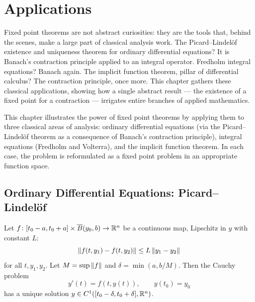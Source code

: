 \chapter{Applications}
\label{ch:applications}

Fixed point theorems are not abstract curiosities: they are the tools that, behind the scenes, make a large part of classical analysis work. The Picard--Lindel\"of existence and uniqueness theorem for ordinary differential equations? It is Banach's contraction principle applied to an integral operator. Fredholm integral equations? Banach again. The implicit function theorem, pillar of differential calculus? The contraction principle, once more. This chapter gathers these classical applications, showing how a single abstract result --- the existence of a fixed point for a contraction --- irrigates entire branches of applied mathematics.

\begin{intuition}
This chapter illustrates the power of fixed point theorems by applying them to three
classical areas of analysis: ordinary differential equations (via the Picard--Lindel\"of
theorem as a consequence of Banach's contraction principle), integral equations (Fredholm
and Volterra), and the implicit function theorem. In each case, the problem is reformulated
as a fixed point problem in an appropriate function space.
\end{intuition}

\section{Ordinary Differential Equations: Picard--Lindel\"of}

\begin{theorem}
\label{thm:picard-lindelof}
Let $f\colon [t_0 - a, t_0 + a] \times \overline{B}(y_0, b) \to \mathbb{R}^n$ be a continuous
map, Lipschitz in $y$ with constant $L$:
\[
  \left\| f(t, y_1) - f(t, y_2) \right\| \leq L \left\| y_1 - y_2 \right\|
\]
for all $t, y_1, y_2$. Let $M = \sup \left\| f \right\|$ and $\delta = \min(a, b/M)$. Then the
Cauchy problem
\[
  y'(t) = f(t, y(t)), \qquad y(t_0) = y_0
\]
has a unique solution $y \in C^1([t_0 - \delta, t_0 + \delta], \mathbb{R}^n)$.
\end{theorem}

